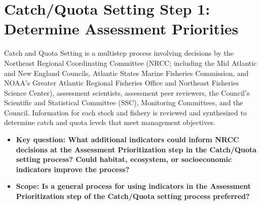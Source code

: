 \documentclass[
]{article}
\author{}
\date{\vspace{-2.5em}}
\providecommand{\tightlist}{%
  \setlength{\itemsep}{0pt}\setlength{\parskip}{0pt}}
\begin{document}
\vspace{-1cm}

\section{Catch/Quota Setting Step 1: Determine Assessment
Priorities}\label{catchquota-setting-step-1-determine-assessment-priorities}

\begin{noteblock}
Catch and Quota Setting is a multistep process involving decisions by
the Northeast Regional Coordinating Committee (NRCC; including the Mid
Atlantic and New England Councils, Atlantic States Marine Fisheries
Commission, and NOAA's Greater Atlantic Regional Fisheries Office and
Northeast Fisheries Science Center), assessment scientists, assessment
peer reviewers, the Council's Scientific and Statistical Committee
(SSC), Monitoring Committees, and the Council. Information for each
stock and fishery is reviewed and synthesized to determine catch and
quota levels that meet management objectives.

\end{noteblock}

\begin{itemize}
\tightlist
\item
  \textbf{Key question: What additional indicators could inform NRCC
  decisions at the Assessment Prioritization step in the Catch/Quota
  setting process? Could habitat, ecosystem, or socioeconomic indicators
  improve the process?}
\item
  \textbf{Scope: Is a general process for using indicators in the
  Assessment Prioritization step of the Catch/Quota setting process
  preferred?}
\end{itemize}
\end{document}
